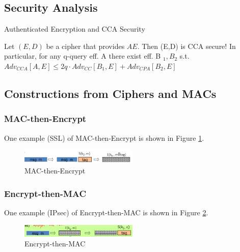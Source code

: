 \subsection{Security Analysis}

\begin{theorem}  Authenticated Encryption and CCA Security

    Let $(E, D)$ be a cipher that provides $A E$.
    Then (E,D) is CCA secure!
    In particular, for any q-query eff. A there exist eff. B $_{1}, B_{2}$ s.t.
    $A d v_{C C A}[A, E] \leq 2 q \cdot A d v_{C C}\left[B_{1}, E\right]+A d v_{C P A}\left[B_{2}, E\right]$
        
\end{theorem}


\subsection{Constructions from Ciphers and MACs}

\subsubsection{MAC-then-Encrypt}

One example (SSL) of MAC-then-Encrypt  is shown in Figure \ref{fig: 05 MAC-then-Encrypt}. 


\begin{figure}[h]
    \centering
    \includegraphics[width=0.5\textwidth]{Stanford_Crypto_1/fig/05_Authentication/M then E.png}
    \caption{MAC-then-Encrypt}
    \label{fig: 05 MAC-then-Encrypt}
\end{figure}


\subsubsection{Encrypt-then-MAC}

One example (IPsec) of Encrypt-then-MAC  is shown in Figure \ref{fig: 05 Encrypt-then-MAC}. 


\begin{figure}[h]
    \centering
    \includegraphics[width=0.5\textwidth]{Stanford_Crypto_1/fig/05_Authentication/E then M.png}
    \caption{Encrypt-then-MAC}
    \label{fig: 05 Encrypt-then-MAC}
\end{figure}


